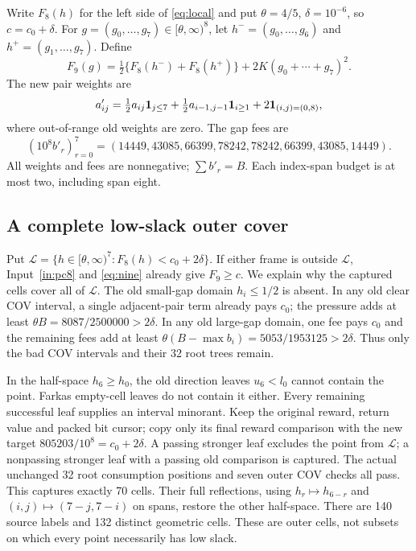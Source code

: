 \documentclass[11pt,a4paper]{article}
\theoremstyle{remark}
\begin{document}
Write $F_8(h)$ for the left side of \eqref{eq:local} and put
$\theta=4/5$, $\delta=10^{-6}$, so $c=c_0+\delta$.
For $g=(g_0,\ldots,g_7)\in[\theta,\infty)^8$, let
$h^-=(g_0,\ldots,g_6)$ and $h^+=(g_1,\ldots,g_7)$. Define
\begin{equation}\label{eq:nine}
 F_9(g)=\tfrac12\{F_8(h^-)+F_8(h^+)\}
                +2K(g_0+\cdots+g_7)^2.
\end{equation}
The new pair weights are
\[
 a'_{ij}=\tfrac12a_{ij}{\bf1}_{j\le7}
        +\tfrac12a_{i-1,j-1}{\bf1}_{i\ge1}
        +2{\bf1}_{(i,j)=(0,8)},
\]
where out-of-range old weights are zero. The gap fees are
\[
 (10^8b'_r)_{r=0}^7=(14449,43085,66399,78242,
                         78242,66399,43085,14449).
\]
All weights and fees are nonnegative; $\sum b'_r=B$.
Each index-span budget is at most two, including span eight.

\subsection{A complete low-slack outer cover}

Put $\mathcal L=\{h\in[\theta,\infty)^7:F_8(h)<c_0+2\delta\}$.
If either frame is outside $\mathcal L$, Input~\ref{in:pc8} and
\eqref{eq:nine} already give $F_9\ge c$.
We explain why the captured cells cover all of $\mathcal L$.
The old small-gap domain $h_i\le1/2$ is absent. In any old clear
COV interval, a single adjacent-pair term already pays $c_0$;
the pressure adds at least $\theta B=8087/2500000>2\delta$.
In any old large-gap domain, one fee pays $c_0$ and the remaining
fees add at least $\theta(B-\max b_i)=5053/1953125>2\delta$.
Thus only the bad COV intervals and their 32 root trees remain.

In the half-space $h_6\ge h_0$, the old direction leaves
$u_6<l_0$ cannot contain the point. Farkas empty-cell leaves do
not contain it either. Every remaining successful leaf supplies an
interval minorant. Keep the original reward, return value and packed
bit cursor; copy only its final reward comparison with the new target
$805203/10^8=c_0+2\delta$. A passing stronger leaf excludes the
point from $\mathcal L$; a nonpassing stronger leaf with a passing
old comparison is captured. The actual unchanged 32 root consumption
positions and seven outer COV checks all pass. This captures exactly
70 cells. Their full reflections, using
$h_r\mapsto h_{6-r}$ and $(i,j)\mapsto(7-j,7-i)$ on spans, restore
the other half-space. There are 140 source labels and 132 distinct
geometric cells. These are outer cells, not subsets on which every
point necessarily has low slack.
\end{document}
